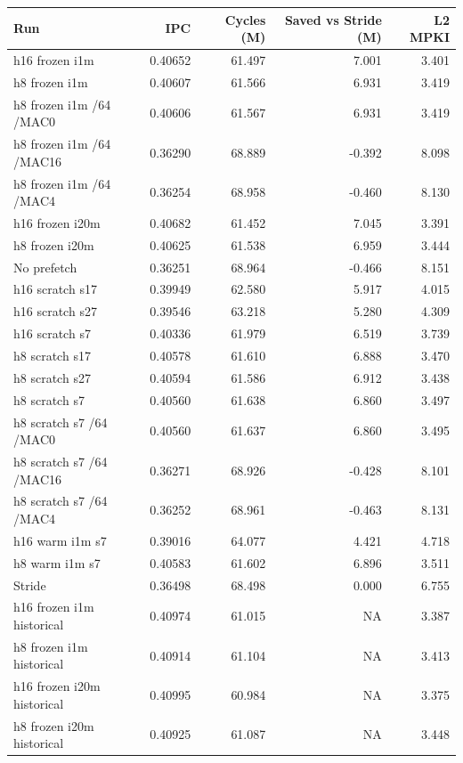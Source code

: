 \documentclass[10pt]{article}
\begin{document}
\begin{center}
\small
\begin{longtable}{lrrrr}
\toprule
Run & IPC & Cycles (M) & Saved vs Stride (M) & L2 MPKI \\
\midrule
\endhead
h16 frozen i1m & 0.40652 & 61.497 & 7.001 & 3.401 \\
h8 frozen i1m & 0.40607 & 61.566 & 6.931 & 3.419 \\
h8 frozen i1m /64 /MAC0 & 0.40606 & 61.567 & 6.931 & 3.419 \\
h8 frozen i1m /64 /MAC16 & 0.36290 & 68.889 & -0.392 & 8.098 \\
h8 frozen i1m /64 /MAC4 & 0.36254 & 68.958 & -0.460 & 8.130 \\
h16 frozen i20m & 0.40682 & 61.452 & 7.045 & 3.391 \\
h8 frozen i20m & 0.40625 & 61.538 & 6.959 & 3.444 \\
No prefetch & 0.36251 & 68.964 & -0.466 & 8.151 \\
h16 scratch s17 & 0.39949 & 62.580 & 5.917 & 4.015 \\
h16 scratch s27 & 0.39546 & 63.218 & 5.280 & 4.309 \\
h16 scratch s7 & 0.40336 & 61.979 & 6.519 & 3.739 \\
h8 scratch s17 & 0.40578 & 61.610 & 6.888 & 3.470 \\
h8 scratch s27 & 0.40594 & 61.586 & 6.912 & 3.438 \\
h8 scratch s7 & 0.40560 & 61.638 & 6.860 & 3.497 \\
h8 scratch s7 /64 /MAC0 & 0.40560 & 61.637 & 6.860 & 3.495 \\
h8 scratch s7 /64 /MAC16 & 0.36271 & 68.926 & -0.428 & 8.101 \\
h8 scratch s7 /64 /MAC4 & 0.36252 & 68.961 & -0.463 & 8.131 \\
h16 warm i1m s7 & 0.39016 & 64.077 & 4.421 & 4.718 \\
h8 warm i1m s7 & 0.40583 & 61.602 & 6.896 & 3.511 \\
Stride & 0.36498 & 68.498 & 0.000 & 6.755 \\
h16 frozen i1m historical & 0.40974 & 61.015 & NA & 3.387 \\
h8 frozen i1m historical & 0.40914 & 61.104 & NA & 3.413 \\
h16 frozen i20m historical & 0.40995 & 60.984 & NA & 3.375 \\
h8 frozen i20m historical & 0.40925 & 61.087 & NA & 3.448 \\
\bottomrule
\end{longtable}
\end{center}
\end{document}
